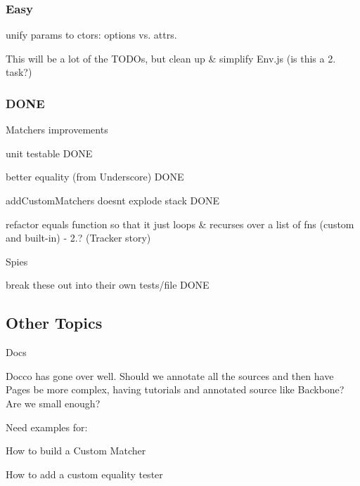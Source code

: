 \subsubsection*{Easy}


\begin{DoxyItemize}
\item unify params to ctors\+: options vs. attrs.
\item This will be a lot of the T\+O\+D\+Os, but clean up \& simplify Env.\+js (is this a 2. task?)
\end{DoxyItemize}

\subsubsection*{D\+O\+N\+E}


\begin{DoxyItemize}
\item Matchers improvements
\begin{DoxyItemize}
\item unit testable D\+O\+N\+E
\item better equality (from Underscore) D\+O\+N\+E
\item add\+Custom\+Matchers doesn\textquotesingle{}t explode stack D\+O\+N\+E
\item refactor equals function so that it just loops \& recurses over a list of fns (custom and built-\/in) -\/ 2.? (Tracker story)
\end{DoxyItemize}
\item Spies
\begin{DoxyItemize}
\item break these out into their own tests/file D\+O\+N\+E
\end{DoxyItemize}
\end{DoxyItemize}

\subsection*{Other Topics}


\begin{DoxyItemize}
\item Docs
\begin{DoxyItemize}
\item Docco has gone over well. Should we annotate all the sources and then have Pages be more complex, having tutorials and annotated source like Backbone? Are we small enough?
\item Need examples for\+:
\begin{DoxyItemize}
\item How to build a Custom Matcher
\item How to add a custom equality tester 
\end{DoxyItemize}
\end{DoxyItemize}
\end{DoxyItemize}